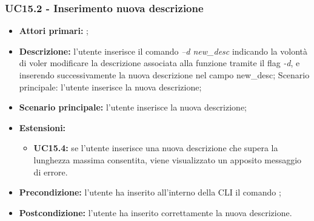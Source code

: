 \subsubsection{UC15.2 - Inserimento nuova descrizione}
\begin{itemize}
	\item \textbf{Attori primari:} \us{};
	\item \textbf{Descrizione:} l'utente inserisce il comando \pedit{} \textit{–d new\_desc} indicando la volontà di voler modificare la descrizione associata alla funzione tramite il flag \textit{-d}, e inserendo successivamente la nuova descrizione nel campo new\_desc;
	Scenario principale: l’utente inserisce la nuova descrizione;   
	\item \textbf{Scenario principale:} l’utente inserisce la nuova descrizione;  
	\item \textbf{Estensioni:} 
	\begin{itemize}
		\item \textbf{UC15.4:} se l’utente inserisce una nuova descrizione che supera la lunghezza massima consentita, viene visualizzato un apposito messaggio di errore. 
	\end{itemize}
	\item \textbf{Precondizione:} l’utente ha inserito all’interno della CLI il comando \edit{};
	\item \textbf{Postcondizione:} l’utente ha inserito correttamente la nuova descrizione.
\end{itemize}